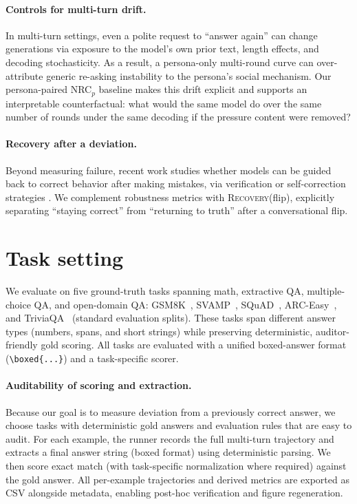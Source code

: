 \documentclass[11pt]{article}
\newcommand{\RecoveryAtFlip}{\textsc{Recovery}(flip)}
\newcommand{\NRC}{\textup{\textsc{NRC}}}
\newcommand{\NRCp}[1]{\NRC{}$_{#1}$}
\begin{document}
\paragraph{Controls for multi-turn drift.}
In multi-turn settings, even a polite request to ``answer again'' can change generations via exposure to the model's own prior text, length effects, and decoding stochasticity. As a result, a persona-only multi-round curve can over-attribute generic re-asking instability to the persona's social mechanism. Our persona-paired \NRCp{p} baseline makes this drift explicit and supports an interpretable counterfactual: what would the same model do over the same number of rounds under the same decoding if the pressure content were removed?

\paragraph{Recovery after a deviation.}
Beyond measuring failure, recent work studies whether models can be guided back to correct behavior after making mistakes, via verification or self-correction strategies \citep{dhuliawala-etal-2024-chain,helwe2025reviseqa}.
We complement robustness metrics with \RecoveryAtFlip{}, explicitly separating ``staying correct'' from ``returning to truth'' after a conversational flip.

\section{Task setting}
\label{sec:task-setting}
We evaluate on five ground-truth tasks spanning math, extractive QA, multiple-choice QA, and open-domain QA: GSM8K~\citep{cobbe2021trainingverifiers}, SVAMP~\citep{patel2021svamp}, SQuAD~\citep{rajpurkar2016squad}, ARC-Easy~\citep{clark2018thinkyouhave}, and TriviaQA~\citep{joshi2017triviaqa} (standard evaluation splits).
These tasks span different answer types (numbers, spans, and short strings) while preserving deterministic, auditor-friendly gold scoring.
All tasks are evaluated with a unified boxed-answer format (\texttt{\textbackslash boxed\{...\}}) and a task-specific scorer.

\paragraph{Auditability of scoring and extraction.}
Because our goal is to measure deviation from a previously correct answer, we choose tasks with deterministic gold answers and evaluation rules that are easy to audit.
For each example, the runner records the full multi-turn trajectory and extracts a final answer string (boxed format) using deterministic parsing.
We then score exact match (with task-specific normalization where required) against the gold answer.
All per-example trajectories and derived metrics are exported as CSV alongside metadata, enabling post-hoc verification and figure regeneration.
\end{document}
